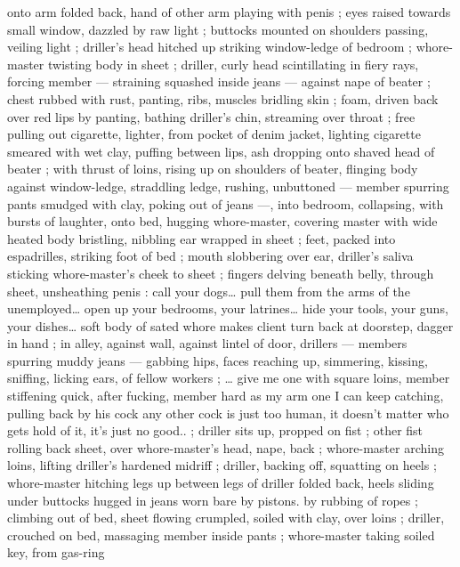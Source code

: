 onto arm folded back, hand of other arm playing with penis ; eyes 
raised towards small window, dazzled by raw light ; buttocks mounted 
on shoulders passing, veiling light ; driller's head hitched up striking 
window-ledge of bedroom ; whore-master twisting body in sheet ; 
driller, curly head scintillating in fiery rays, forcing member --- 
straining squashed inside jeans --- against nape of beater ; chest 
rubbed with rust, panting, ribs, muscles bridling skin ; foam, driven 
back over red lips by panting, bathing driller's chin, streaming over 
throat ; free pulling out cigarette, lighter, from pocket of denim 
jacket, lighting cigarette smeared with wet clay, puffing between lips, 
ash dropping onto shaved head of beater ; with thrust of loins, rising 
up on shoulders of beater, flinging body against window-ledge, 
straddling ledge, rushing, unbuttoned --- member spurring pants 
smudged with clay, poking out of jeans ---, into bedroom, collapsing, 
with bursts of laughter, onto bed, hugging whore-master, covering 
master with wide heated body bristling, nibbling ear wrapped in sheet 
; feet, packed into espadrilles, striking foot of bed ; mouth 
slobbering over ear, driller's saliva sticking whore-master's cheek to 
sheet ; fingers delving beneath belly, through sheet, unsheathing 
penis :{\td} {\gl} call your dogs{\ldots} pull them from the arms of the 
unemployed{\ldots} open up your bedrooms, your latrines{\ldots} hide your 
tools, your guns, your dishes{\ldots} soft body of sated whore makes 
client turn back at doorstep, dagger in hand{\td} {\gr} ; in alley, against wall, 
against lintel of door, drillers --- members spurring muddy jeans --- 
gabbing hips, faces reaching up, simmering, kissing, sniffing, licking 
ears, of fellow workers ; {\ldots} {\gl}{\td} give me one with square loins, member 
stiffening quick, after fucking, member hard as my arm{\td} one I can 
keep catching, pulling back by his cock{\td} any other cock is just too 
human, it doesn't matter who gets hold of it, it's just no good..{\gr} ; 
driller sits up, propped on fist ; other fist rolling back sheet, over 
whore-master's head, nape, back ; whore-master arching loins, lifting 
driller's hardened midriff ; driller, backing off, squatting on heels ; 
whore-master hitching legs up between legs of driller folded back, 
heels sliding under buttocks hugged in jeans worn bare by pistons. 
by rubbing of ropes ; climbing out of bed, sheet flowing crumpled, 
soiled with clay, over loins ; driller, crouched on bed, massaging 
member inside pants ; whore-master taking soiled key, from gas-ring 
